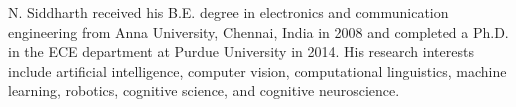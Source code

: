 \begin{vita}
  N. Siddharth received his B.E. degree in electronics and communication
  engineering from Anna University, Chennai, India in 2008 and completed a
  Ph.D. in the ECE department at Purdue University in 2014.
  His research interests include artificial intelligence, computer vision,
  computational linguistics, machine learning, robotics, cognitive science, and
  cognitive neuroscience.
\end{vita}
